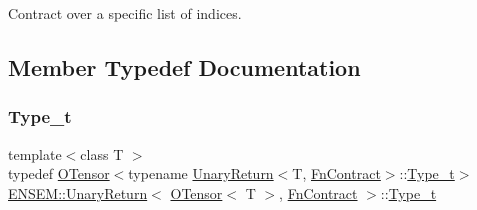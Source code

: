 Contract over a specific list of indices. 

\subsection{Member Typedef Documentation}
\mbox{\label{structENSEM_1_1UnaryReturn_3_01OTensor_3_01T_01_4_00_01FnContract_01_4_a5b94783dc2f622ca8629f6318a2332ac}} 
\subsubsection{\texorpdfstring{Type\_t}{Type\_t}\hspace{0.1cm}{\footnotesize\ttfamily [1/2]}}
{\footnotesize\ttfamily template$<$class T $>$ \\
typedef \mbox{\hyperlink{classENSEM_1_1OTensor}{O\+Tensor}}$<$typename \mbox{\hyperlink{structENSEM_1_1UnaryReturn}{Unary\+Return}}$<$T, \mbox{\hyperlink{structENSEM_1_1FnContract}{Fn\+Contract}}$>$\+::\mbox{\hyperlink{structENSEM_1_1UnaryReturn_3_01OTensor_3_01T_01_4_00_01FnContract_01_4_a5b94783dc2f622ca8629f6318a2332ac}{Type\+\_\+t}}$>$ \mbox{\hyperlink{structENSEM_1_1UnaryReturn}{E\+N\+S\+E\+M\+::\+Unary\+Return}}$<$ \mbox{\hyperlink{classENSEM_1_1OTensor}{O\+Tensor}}$<$ T $>$, \mbox{\hyperlink{structENSEM_1_1FnContract}{Fn\+Contract}} $>$\+::\mbox{\hyperlink{structENSEM_1_1UnaryReturn_3_01OTensor_3_01T_01_4_00_01FnContract_01_4_a5b94783dc2f622ca8629f6318a2332ac}{Type\+\_\+t}}}

\mbox{\label{structENSEM_1_1UnaryReturn_3_01OTensor_3_01T_01_4_00_01FnContract_01_4_a5b94783dc2f622ca8629f6318a2332ac}} 
